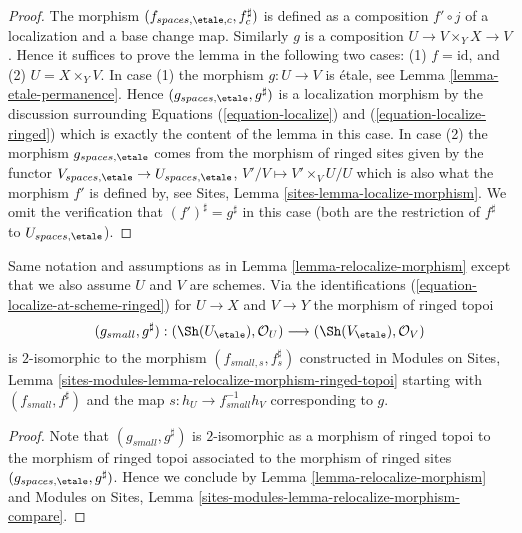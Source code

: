 \begin{proof}
The morphism $(f_{spaces, \etale, c}, f_c^\sharp)$ is defined as a
composition $f' \circ j$
of a localization and a base change map. Similarly $g$ is a composition
$U \to V \times_Y X \to V$. Hence it suffices to prove
the lemma in the following two cases: (1) $f = \text{id}$, and
(2) $U = X \times_Y V$. In case (1) the morphism $g : U \to V$ is
\'etale, see
Lemma \ref{lemma-etale-permanence}.
Hence $(g_{spaces, \etale}, g^\sharp)$ is a localization morphism
by the discussion surrounding
Equations (\ref{equation-localize}) and
(\ref{equation-localize-ringed})
which is exactly the content of the lemma in this case.
In case (2) the morphism $g_{spaces, \etale}$
comes from the morphism of ringed sites given by the functor
$V_{spaces, \etale} \to U_{spaces, \etale}$,
$V'/V \mapsto V' \times_V U/U$
which is also what the morphism $f'$ is defined by, see
Sites, Lemma \ref{sites-lemma-localize-morphism}.
We omit the verification that $(f')^\sharp = g^\sharp$
in this case (both are the restriction of $f^\sharp$
to $U_{spaces, \etale}$).
\end{proof}

\begin{lemma}
\label{lemma-relocalize-morphism-at-schemes}
Same notation and assumptions as in
Lemma \ref{lemma-relocalize-morphism}
except that we also assume $U$ and $V$ are schemes.
Via the identifications
(\ref{equation-localize-at-scheme-ringed})
for $U \to X$ and $V \to Y$ the morphism of ringed topoi
$$
(g_{small}, g^\sharp) :
(\Sh(U_\etale), \mathcal{O}_U)
\longrightarrow
(\Sh(V_\etale), \mathcal{O}_V)
$$
is $2$-isomorphic to the morphism $(f_{small, s}, f_s^\sharp)$
constructed in
Modules on Sites,
Lemma \ref{sites-modules-lemma-relocalize-morphism-ringed-topoi}
starting with $(f_{small}, f^\sharp)$ and
the map $s : h_U \to f_{small}^{-1}h_V$ corresponding to $g$.
\end{lemma}

\begin{proof}
Note that $(g_{small}, g^\sharp)$ is $2$-isomorphic as a
morphism of ringed topoi to the morphism of ringed topoi
associated to the morphism of ringed sites
$(g_{spaces, \etale}, g^\sharp)$. Hence we conclude by
Lemma \ref{lemma-relocalize-morphism}
and
Modules on Sites,
Lemma \ref{sites-modules-lemma-relocalize-morphism-compare}.
\end{proof}












